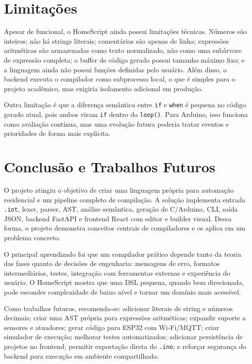 \documentclass[conference]{IEEEtran}
\begin{document}
\section{Limitações}

Apesar de funcional, o HomeScript ainda possui limitações técnicas. Números são inteiros; não há strings literais; comentários são apenas de linha; expressões aritméticas são armazenadas como texto normalizado, não como uma subárvore de expressão completa; o buffer de código gerado possui tamanho máximo fixo; e a linguagem ainda não possui funções definidas pelo usuário. Além disso, o backend executa o compilador como subprocesso local, o que é simples para o projeto acadêmico, mas exigiria isolamento adicional em produção.

Outra limitação é que a diferença semântica entre \texttt{if} e \texttt{when} é pequena no código gerado atual, pois ambos viram \texttt{if} dentro do \texttt{loop()}. Para Arduino, isso funciona como avaliação contínua, mas uma evolução futura poderia tratar eventos e prioridades de forma mais explícita.

\section{Conclusão e Trabalhos Futuros}

O projeto atingiu o objetivo de criar uma linguagem própria para automação residencial e um pipeline completo de compilação. A solução implementa entrada \texttt{.iot}, lexer, parser, AST, análise semântica, geração de C/Arduino, CLI, saída JSON, backend FastAPI e frontend React com editor e builder visual. Dessa forma, o projeto demonstra conceitos centrais de compiladores e os aplica em um problema concreto.

O principal aprendizado foi que um compilador prático depende tanto da teoria das fases quanto de decisões de engenharia: mensagens de erro, formatos intermediários, testes, integração com ferramentas externas e experiência do usuário. O HomeScript mostra que uma DSL pequena, quando bem direcionada, pode esconder complexidade de baixo nível e tornar um domínio mais acessível.

Como trabalhos futuros, recomenda-se: adicionar literais de string e números decimais; criar uma AST própria para expressões aritméticas; expandir suporte a sensores e atuadores; gerar código para ESP32 com Wi-Fi/MQTT; criar simulador de execução; melhorar testes automatizados; adicionar persistência de projetos no frontend; permitir exportação direta do \texttt{.ino}; e reforçar segurança do backend para execução em ambiente compartilhado.
\end{document}
